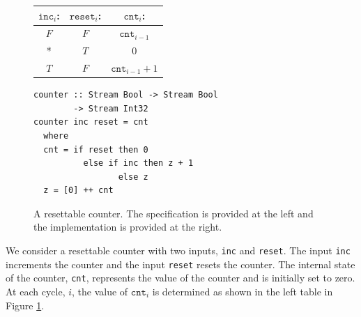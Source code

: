 \begin{figure}
\begin{minipage}{0.4\linewidth}
\begin{tabular}{c|c||c}
$\mathtt{inc}_i$: & $\mathtt{reset}_i$: & $\mathtt{cnt}_i$: \\
\hline
$F$ & $F$ & $\mathtt{cnt}_{i-1}$ \\
\hline
* & $T$ & $0$ \\
\hline
$T$ & $F$ & $\mathtt{cnt}_{i-1} + 1$ \\
\hline
\end{tabular}
\end{minipage}
\hspace{1cm}
\begin{minipage}{0.6\linewidth}
\begin{lstlisting}[language = Copilot, frame = none]
counter :: Stream Bool -> Stream Bool
        -> Stream Int32
counter inc reset = cnt
  where 
  cnt = if reset then 0
          else if inc then z + 1
                 else z
  z = [0] ++ cnt
\end{lstlisting}
\end{minipage}
\caption{A resettable counter. The specification is provided at the left and the
implementation is provided at the right.
}
\label{fig:counter}
\end{figure}

\begin{example}
We consider a resettable counter with two inputs, {\tt inc} and {\tt reset}.
The input {\tt inc} increments the counter and the input {\tt reset} resets the
counter. The internal state of the counter, {\tt cnt}, represents the value of the
counter and is initially set to zero. At each cycle, $i$, the value of
$\mathtt{cnt}_i$ is determined as shown in the left table in Figure
\ref{fig:counter}.
\end{example}


